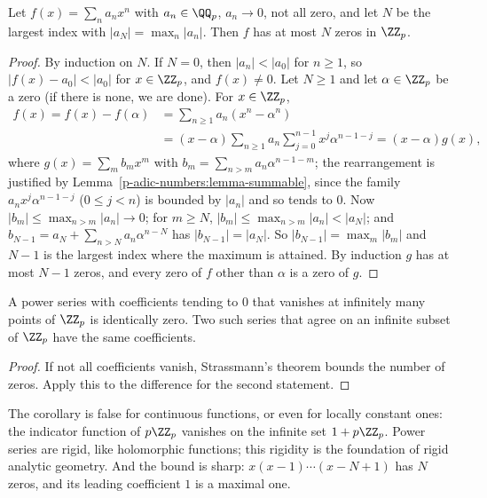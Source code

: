 \begin{theorem}[Strassmann]\label{p-adic-numbers:theorem-strassmann}
Let $f(x) = \sum_na_nx^n$ with $a_n \in \QQ_p$, $a_n \to 0$, not all zero, and let $N$ be the largest index with $|a_N| = \max_n|a_n|$. Then $f$ has at most $N$ zeros in $\ZZ_p$.
\end{theorem}

\begin{proof}
By induction on $N$. If $N = 0$, then $|a_n| < |a_0|$ for $n \geq 1$, so $|f(x) - a_0| < |a_0|$ for $x \in \ZZ_p$, and $f(x) \neq 0$. Let $N \geq 1$ and let $\alpha \in \ZZ_p$ be a zero (if there is none, we are
done). For $x \in \ZZ_p$,
\[
\begin{aligned}
f(x) = f(x) - f(\alpha) &= \sum_{n \geq 1}a_n(x^n - \alpha^n) \\
&= (x - \alpha)\sum_{n \geq 1}a_n\sum_{j=0}^{n-1}x^j\alpha^{n-1-j} = (x - \alpha)g(x),
\end{aligned}
\]
where $g(x) = \sum_mb_mx^m$ with $b_m = \sum_{n > m}a_n\alpha^{n-1-m}$; the rearrangement is justified by Lemma~\ref{p-adic-numbers:lemma-summable}, since the family $a_nx^j\alpha^{n-1-j}$ ($0 \leq j < n$)
is bounded by $|a_n|$ and so tends to $0$. Now $|b_m| \leq \max_{n > m}|a_n| \to 0$; for $m \geq N$, $|b_m| \leq \max_{n > m}|a_n| < |a_N|$; and $b_{N-1} = a_N + \sum_{n > N}a_n\alpha^{n-N}$ has
$|b_{N-1}| = |a_N|$. So $|b_{N-1}| = \max_m|b_m|$ and $N - 1$ is the largest index where the maximum is attained. By induction $g$ has at most $N - 1$ zeros, and every zero of $f$ other than $\alpha$
is a zero of $g$.
\end{proof}

\begin{corollary}\label{p-adic-numbers:corollary-strassmann}
A power series with coefficients tending to $0$ that vanishes at infinitely many points of $\ZZ_p$ is identically zero. Two such series that agree on an infinite subset of $\ZZ_p$ have the same coefficients.
\end{corollary}

\begin{proof}
If not all coefficients vanish, Strassmann's theorem bounds the number of zeros. Apply this to the difference for the second statement.
\end{proof}

\begin{counterexample}\label{p-adic-numbers:counterexample-strassmann}
The corollary is false for continuous functions, or even for locally constant ones: the indicator function of $p\ZZ_p$ vanishes on the infinite set $1 + p\ZZ_p$. Power series are rigid, like
holomorphic functions; this rigidity is the foundation of rigid analytic geometry. And the bound is sharp: $x(x - 1)\cdots(x - N + 1)$ has $N$ zeros, and its leading coefficient $1$ is a maximal one.
\end{counterexample}


